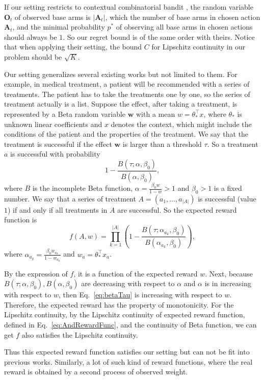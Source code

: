 \documentclass{article}
\newcommand{\bA}{\mathbf{A}}
\newcommand{\bO}{\mathbf{O}}
\newcommand{\bw}{\mathbf{w}}
\begin{document}
If our setting restricts to contextual combinatorial bandit \cite{qin2014contextual}, the random variable $\bO_t$ of observed base arms is $|\bA_t|$, which the number of base arms in chosen action $\bA_t$, and the minimal probability $p^*$ of observing all base arms in chosen actions should always be $1$. So our regret bound is of the same order with theirs. Notice that when applying their setting, the bound $C$ for Lipschitz continuity in our problem should be $\sqrt{K}$.

Our setting generalizes several existing works but not limited to them. For example, in medical treatment, a patient will be recommended with a series of treatments. The patient has to take the treatments one by one, so the series of treatment actually is a list. Suppose the effect, after taking a treatment, is represented by a Beta random variable $\bw$ with a mean $w = \theta_*^{\top}x$, where $\theta_*$ is unknown linear coefficients and $x$ denotes the context, which might include the conditions of the patient and the properties of the treatment. We say that the treatment is successful if the effect $\bw$ is larger than a threshold $\tau$. So a treatment $a$ is successful with probability
\begin{equation}
\label{eq:betaTau}
1 - \frac{B(\tau; \alpha, \beta_0)}{B(\alpha, \beta_0)},
\end{equation}
where $B$ is the incomplete Beta function, $\alpha = \frac{\beta_0 w}{1- w} > 1$ and $\beta_0 > 1$ is a fixed number. We say that a series of treatment $A = (a_1, \ldots, a_{|A|})$ is successful (value $1$) if and only if all treatments in $A$ are successful. So the expected reward function is
$$
f(A, w) = \prod_{k=1}^{|A|} (1 - \frac{B(\tau; \alpha_{a_k}, \beta_0)}{B(\alpha_{a_k}, \beta_0)}),
$$
where $\alpha_{a_k} = \frac{\beta_0 w_{a_k}}{1- w_{a_k}}$ and $w_a = \theta_*^{\top}x_{a}$.

By the expression of $f$, it is a function of the expected reward $w$. Next, because $B(\tau; \alpha, \beta_0), B(\alpha, \beta_0)$ are decreasing with respect to $\alpha$ and $\alpha$ is in increasing with respect to $w$, then Eq.~\eqref{eq:betaTau} is increasing with respect to $w$. Therefore, the expected reward has the property of monotonicity. For the Lipschitz continuity, by the Lipschitz continuity of expected reward function, defined in Eq.~\eqref{eq:AndRewardFunc}, and the continuity of Beta function, we can get $f$ also satisfies the Lipschitz continuity.

Thus this expected reward function satisfies our setting but can not be fit into previous works. Similarly, a lot of such kind of reward functions, where the real reward is obtained by a second process of observed weight.
\end{document}
